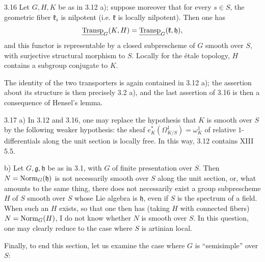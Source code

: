 \begin{corollary}{3.16}\label{XIV.3.16}
Let $G,H,K$ be as in 3.12 a); suppose
moreover that for every $s\in S$, the
geometric fiber $\mathfrak k_{\bar s}$
is nilpotent (i.e. $\mathfrak k$ is
locally nilpotent). Then one has
\[
 \underline{\operatorname{Transp}}_G(K,H)=\underline{\operatorname{Transp}}_G(\mathfrak k,\mathfrak h),
\]
and this functor is representable by
a closed subprescheme of $G$ smooth
over $S$, with surjective structural
morphism to $S$. Locally for the
\'etale topology, $H$ contains a
subgroup conjugate to $K$.
\end{corollary}
The identity of the two transporters
is again contained in 3.12 a); the
assertion about its structure is
then precisely 3.2 a), and the last
assertion of 3.16 is then a consequence
of Hensel's lemma.

\begin{remarks}{3.17}\label{XIV.3.17}
\noindent a) In 3.12 and 3.16, one
may replace the hypothesis that
$K$ is smooth over $S$ by the
following weaker hypothesis:
the sheaf $e_K^*(\Omega^1_{K/S})=\omega_K^1$
of relative $1$-differentials along
the unit section is locally free.
In this way, 3.12 contains XIII 5.5.

\noindent b) Let $G,\mathfrak g,\mathfrak h$
be as in 3.1, with $G$ of finite
presentation over $S$. Then
$N=\operatorname{Norm}_G(\mathfrak h)$ is not
necessarily smooth over $S$ along
the unit section, or, what amounts
to the same thing, there does not
necessarily exist a group
subprescheme $H$ of $S$ smooth
over $S$ whose Lie algebra is
$\mathfrak h$, even if $S$ is
the spectrum of a field. When
such an $H$ exists, so that one
then has (taking $H$ with
connected fibers) $N=\operatorname{Norm}_G(H)$,
I do not know whether $N$ is
smooth over $S$. In this question,
one may clearly reduce to the
case where $S$ is artinian local.
\end{remarks}
Finally, to end this section,
let us examine the case where
$G$ is ``semisimple'' over $S$:

